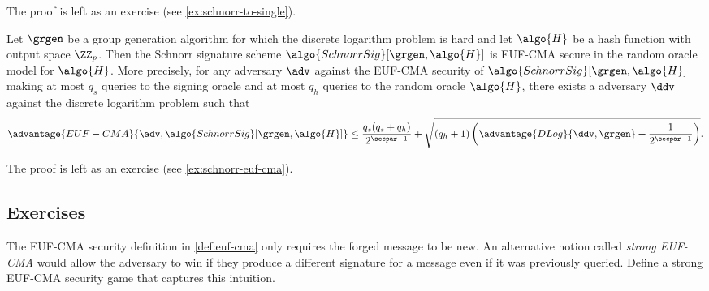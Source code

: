 The proof is left as an exercise (see \autoref{ex:schnorr-to-single}).

\begin{theorem}\label{thm:schnorr-euf-cma}
  Let $\grgen$ be a group generation algorithm for which the discrete logarithm problem is hard and let $\algo{H}$ be a hash function with output space $\ZZ_p$.
  Then the Schnorr signature scheme $\algo{SchnorrSig}[\grgen, \algo{H}]$ is EUF-CMA secure in the random oracle model for $\algo{H}$.
  More precisely, for any \ppt adversary $\adv$ against the EUF-CMA security of $\algo{SchnorrSig}[\grgen, \algo{H}]$ making at most $q_s$ queries to the signing oracle and at most $q_h$ queries to the random oracle $\algo{H}$,
  there exists a \ppt adversary $\ddv$ against the discrete logarithm problem such that
  \[
    \advantage{EUF-CMA}{\adv, \algo{SchnorrSig}[\grgen, \algo{H}]} \leq \frac{q_s(q_s + q_h)}{2^{\secpar-1}} + \sqrt{(q_h + 1) \left(\advantage{DLog}{\ddv, \grgen} + \frac{1}{2^{\secpar-1}}\right)}.
  \]
\end{theorem}

The proof is left as an exercise (see \autoref{ex:schnorr-euf-cma}).

\subsection{Exercises}

\begin{exercise}
  The EUF-CMA security definition in \autoref{def:euf-cma} only requires the forged message to be new. An alternative notion called \emph{strong EUF-CMA} would allow the adversary to win if they produce a different signature for a message even if it was previously queried. Define a strong EUF-CMA security game that captures this intuition.
\end{exercise}

